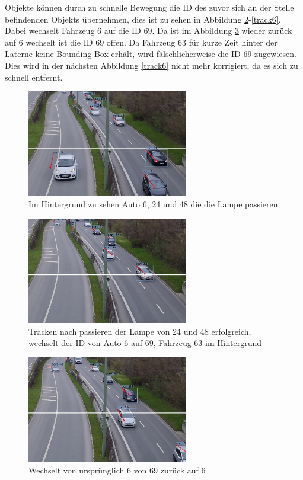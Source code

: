 \documentclass[conference]{IEEEtran}
\begin{document}
	Objekte können durch zu schnelle Bewegung die ID des zuvor sich an der Stelle
	befindenden Objekts übernehmen, dies ist zu sehen in Abbildung \ref{track4}-\ref{track6}.
	Dabei wechselt Fahrzeug 6 auf die ID 69. Da ist im Abbildung \ref{track5} wieder zurück auf 6
	wechselt ist die ID 69 offen. Da Fahrzeug 63 für kurze Zeit hinter der Laterne keine Bounding Box erhält, wird fälschlicherweise die ID 69 zugewiesen.
	Dies wird in der nächsten Abbildung \ref{track6} nicht mehr korrigiert, da es sich zu schnell entfernt.
	
	\begin{figure}[!h]
		\begin{center}
			\includegraphics[width=7cm]{Media/switch1.jpg}
			\caption{Im Hintergrund zu sehen Auto 6, 24 und 48 die die Lampe passieren}
			\label{track3}
		\end{center}
	\end{figure}
	\begin{figure}[!h]
		\begin{center}
			\includegraphics[width=7cm]{Media/switch2.jpg}
			\caption{Tracken nach passieren der Lampe von 24 und 48 erfolgreich, wechselt der ID von Auto 6 auf 69, Fahrzeug 63 im Hintergrund}
			\label{track4}
		\end{center}
	\end{figure}
	\begin{figure}[!h]
		\begin{center}
			\includegraphics[width=7cm]{Media/switch3.jpg}
			\caption{Wechselt von ursprünglich 6 von 69 zurück auf 6 }
			\label{track5}
		\end{center}
	\end{figure}
\end{document}
